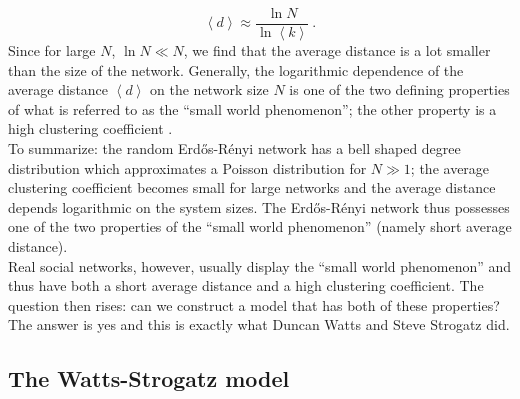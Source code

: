\documentclass[11 pt , letterpaper , twoside , openright]{book}
\begin{document}
\begin{equation}\label{d}
	\left<d\right> \approx \frac{\ln{N}}{\ln{\left<k\right>}} \ .
\end{equation}
Since for large $N$, $\ln{N} \ll N$, we find that the average distance is a lot smaller than the size of the network. Generally, the logarithmic dependence of the average distance $\left<d\right>$ on the network size $N$ is one of the two defining properties of what is referred to as the ``small world phenomenon''; the other property is a high clustering coefficient \cite{Easley2010}.  \\
\newline
To summarize: the random Erd\H{o}s-R\'{e}nyi network has a bell shaped degree distribution which approximates a Poisson distribution for $N \gg 1$; the average clustering coefficient becomes small for large networks and the average distance depends logarithmic on the system sizes. The Erd\H{o}s-R\'{e}nyi network thus possesses one of the two properties of the ``small world phenomenon'' (namely short average distance).\\
\newline
Real social networks, however, usually display the ``small world phenomenon'' and thus have both a short average distance and a high clustering coefficient. The question then rises: can we construct a model that has both of these properties? The answer is yes and this is exactly what Duncan Watts and Steve Strogatz did.

\subsection{The Watts-Strogatz model}
\end{document}
